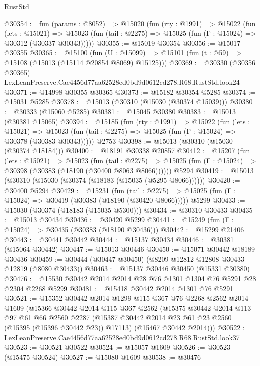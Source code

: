 \begin{lexlean}{RustStd}
\begin{coremodule}
@30354 := fun (params : @8052) =>
  @15020
    (fun (rty : @1991) =>
    @15022
      (fun (lets : @15021) =>
      @15023 (fun (tail : @2275) => @15025 (fun (Γ : @15024) => @30312 (@30337 @30343)))))
@30355 := @15019 @30354
@30356 := @15017 @30355
@30365 := @15100
    (fun (U : @15099) => @15101 (fun (t : @59) => @15108 (@15013 (@15114 @20854 @8069) @15125)))
@30369 := @30330
    (@30356 @30365)
    LexLeanPreserve.Cae4456d77aa62528ed0bd9d0612cd278.R68.RustStd.look24
@30371 := @14998 @30355 @30365
@30373 := @15182 @30354 @5285
@30374 := @15031 @5285
@30378 := @15013 (@30310 (@15030 (@30374 @15039)))
@30380 := @30333 (@15060 @5285)
@30381 := @15045 @30380
@30383 := @15013 (@30381 @15065)
@30394 := @15185
    (fun (rty : @1991) =>
    @15022
      (fun (lets : @15021) =>
      @15023 (fun (tail : @2275) => @15025 (fun (Γ : @15024) => @30378 (@30383 @30343)))))
    @2753
@30398 := @15013 (@30310 (@15030 (@30374 @18184)))
@30400 := @18191 @30338 @20857
@30412 := @15207
    (fun (lets : @15021) =>
    @15023
      (fun (tail : @2275) =>
      @15025 (fun (Γ : @15024) => @30398 (@30383 (@18190 (@30400 @8063 @8066))))))
    @5294
@30419 := @15013 (@30310 (@15030 (@30374 (@18183 (@15035 (@5295 @8066))))))
@30420 := @30400 @5294
@30429 := @15231
    (fun (tail : @2275) => @15025 (fun (Γ : @15024) => @30419 (@30383 (@18190 (@30420 @8066)))))
    @5299
@30433 := @15030 (@30374 (@18183 (@15035 @5300)))
@30434 := @30310 @30433
@30435 := @15013 @30434
@30436 := @30420 @5299
@30441 := @15249 (fun (Γ : @15024) => @30435 (@30383 (@18190 @30436)))
@30442 := @15299 @21406
@30443 := @30441 @30442
@30444 := @15137 @30434
@30446 := @30381 (@15064 @30442)
@30447 := @15013 @30446
@30450 := @15071 @30442 @18189 @30436
@30459 := @30444 (@30447 @30450) (@8209 @12812 @12808 @30433 @12819 (@8080 @30433))
@30463 := @15137 @30446 @30450 (@15331 @30380)
@30476 := @15530 @30442 @2014 @2014 @28 @76 @1301 @1304 @76 @5291 @28 @2304 @2268 @5299
@30481 := @15418 @30442 @2014 @1301 @76 @5291
@30521 := @15352
    @30442
    @2014
    @1299
    @115
    @367
    @76
    @2268
    @2562
    @2014
    @1609
    (@15366
      @30442
      @2014
      @115
      @367
      @2562
      (@15375
        @30442
        @2014
        @113
        @97
        @61
        @66
        @2560
        @2287
        (@15387 @30442 @2014 @23 @61 @23 @2560 (@15395 (@15396 @30442 @23)) @17113)
        (@15467 @30442 @2014)))
@30522 := LexLeanPreserve.Cae4456d77aa62528ed0bd9d0612cd278.R68.RustStd.look37
@30523 := @30521 @30522
@30524 := @15057 @1609
@30526 := @30523 (@15475 @30524)
@30527 := @15080 @1609
@30538 := @30476

\end{coremodule}
\end{lexlean}
